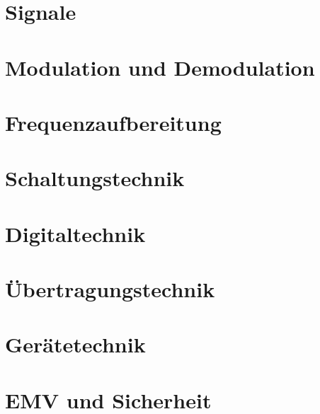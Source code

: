 \documentclass[ngerman,openany,twoside]{Script}
\begin{document}
\chapter{Signale}


\chapter{Modulation und Demodulation}


\chapter{Frequenzaufbereitung}


\chapter{Schaltungstechnik}


\chapter{Digitaltechnik}


\chapter{Übertragungstechnik}


\chapter{Gerätetechnik}


\chapter{EMV und Sicherheit}



\end{document}
